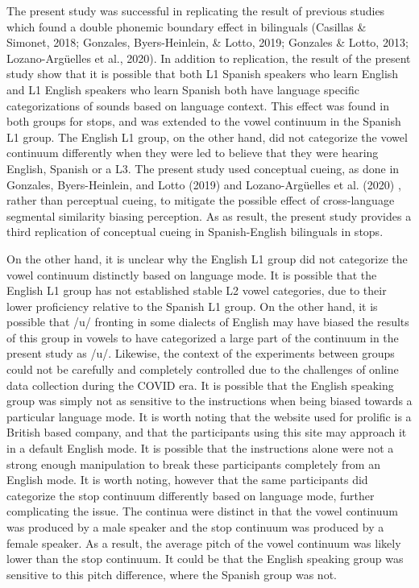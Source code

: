 \documentclass[
  english,
  man]{apa6}
\begin{document}
The present study was successful in replicating the result of previous studies which found a double phonemic boundary effect in bilinguals (Casillas \& Simonet, 2018; Gonzales, Byers-Heinlein, \& Lotto, 2019; Gonzales \& Lotto, 2013; Lozano-Argüelles et al., 2020). In addition to replication, the result of the present study show that it is possible that both L1 Spanish speakers who learn English and L1 English speakers who learn Spanish both have language specific categorizations of sounds based on language context. This effect was found in both groups for stops, and was extended to the vowel continuum in the Spanish L1 group. The English L1 group, on the other hand, did not categorize the vowel continuum differently when they were led to believe that they were hearing English, Spanish or a L3.
The present study used conceptual cueing, as done in Gonzales, Byers-Heinlein, and Lotto (2019) and Lozano-Argüelles et al. (2020) , rather than perceptual cueing, to mitigate the possible effect of cross-language segmental similarity biasing perception. As as result, the present study provides a third replication of conceptual cueing in Spanish-English bilinguals in stops.

On the other hand, it is unclear why the English L1 group did not categorize the vowel continuum distinctly based on language mode. It is possible that the English L1 group has not established stable L2 vowel categories, due to their lower proficiency relative to the Spanish L1 group. On the other hand, it is possible that /u/ fronting in some dialects of English may have biased the results of this group in vowels to have categorized a large part of the continuum in the present study as /u/. Likewise, the context of the experiments between groups could not be carefully and completely controlled due to the challenges of online data collection during the COVID era. It is possible that the English speaking group was simply not as sensitive to the instructions when being biased towards a particular language mode. It is worth noting that the website used for prolific is a British based company, and that the participants using this site may approach it in a default English mode. It is possible that the instructions alone were not a strong enough manipulation to break these participants completely from an English mode. It is worth noting, however that the same participants did categorize the stop continuum differently based on language mode, further complicating the issue. The continua were distinct in that the vowel continuum was produced by a male speaker and the stop continuum was produced by a female speaker. As a result, the average pitch of the vowel continuum was likely lower than the stop continuum. It could be that the English speaking group was sensitive to this pitch difference, where the Spanish group was not.
\end{document}
